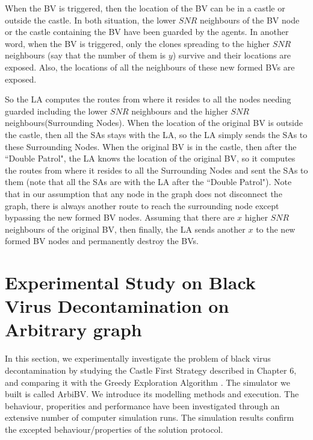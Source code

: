 
When the BV is triggered, then the location of the BV can be in a castle or outside the castle. In both situation, the lower $SNR$ neighbours of the BV node or the castle containing the BV have been guarded by the agents. In another word, when the BV is triggered, only the clones spreading to the higher $SNR$ neighbours (say that the number of them is $y$) survive and their locations are exposed. Also, the locations of all the neighbours of these new formed BVs are exposed. 

So the LA computes the routes from where it resides to all the nodes needing guarded including the lower $SNR$ neighbours and the higher $SNR$ neighbours(Surrounding Nodes). When the location of the original BV is outside the castle, then all the SAs stays with the LA, so the LA simply sends the SAs to these Surrounding Nodes. When the original BV is in the castle, then after the  ``Double Patrol", the LA knows the location of the original BV, so it computes the routes from where it resides to all the Surrounding Nodes and sent the SAs to them (note that all the SAs are with the LA after the  ``Double Patrol"). Note that in our assumption that any node in the graph does not disconnect the graph, there is always another route to reach the surrounding node  except bypassing the new formed BV nodes. Assuming that there are $x$ higher $SNR$ neighbours of the original BV, then finally, the LA sends another $x$ to the new formed BV nodes and permanently destroy the BVs.



\section{Experimental Study on Black Virus Decontamination on Arbitrary graph}
In this section, we experimentally investigate the problem of black virus decontamination by studying the Castle First Strategy described in Chapter 6, and comparing it with the Greedy Exploration Algorithm \cite{Cai}.
The simulator we built is called ArbiBV. We introduce its modelling methods and execution. The behaviour, properities and performance have been investigated through an extensive number of computer simulation runs. The simulation results confirm the excepted behaviour/properties of the solution protocol. 
